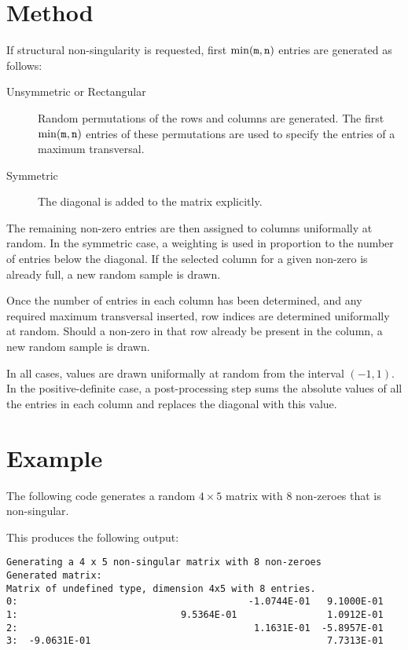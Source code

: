 \section{Method}

If structural non-singularity is requested, first $\min({\tt m}, {\tt n})$ entries are generated as follows:
\begin{description}
   \item[Unsymmetric or Rectangular] Random permutations of the rows and
      columns are generated. The first $\min({\tt m}, {\tt n})$ entries of
      these permutations are used to specify the entries of a maximum
      transversal.
   \item[Symmetric] The diagonal is added to the matrix explicitly.
\end{description}

The remaining non-zero entries are then assigned to columns uniformally at
random. In the symmetric case, a weighting is used in proportion to the number of
entries below the diagonal. If the selected column for a given non-zero is 
already full, a new random sample is drawn.

Once the number of entries in each column has been determined, and any required
maximum transversal inserted, row indices are determined uniformally at random.
Should a non-zero in that row already be present in the column, a new random
sample is drawn.

In all cases, values are drawn uniformally at random from the interval $(-1,1)$. In
the positive-definite case, a post-processing step sums the absolute values of
all the entries in each column and replaces the diagonal with this value.


\section{Example}

The following code generates a random $4 \times 5$ matrix with $8$ non-zeroes
that is non-singular.

This produces the following output:
\begin{verbatim}
Generating a 4 x 5 non-singular matrix with 8 non-zeroes
Generated matrix:
Matrix of undefined type, dimension 4x5 with 8 entries.
0:                                         -1.0744E-01   9.1000E-01
1:                             9.5364E-01                1.0912E-01
2:                                          1.1631E-01  -5.8957E-01
3:  -9.0631E-01                                          7.7313E-01
\end{verbatim}

\begin{funders}
\end{funders}
